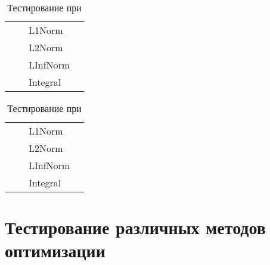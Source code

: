 \begin{table}
	\caption{Тестирование при }
	\centering
	\small
	\begin{tabularx}{1.0\textwidth}{| >{\raggedright\arraybackslash}X | >{\raggedright\arraybackslash}X | >{\raggedright\arraybackslash}X | >{\raggedright\arraybackslash}X |}
		\hline
		\centering{Входные точки}  & \centering{Функция} & \centering{Функционал} & \centering{Результат} \tabularnewline \hline    
		
		\multirow{4}{*}{\centering{(0.5; 0.5; 0.5)}} & \multirow{4}{*}{\centering{FFFFF}} & L1Norm & \centering{0.00000000E+000; 0.00000000E+000; 0.00000000E+000} \tabularnewline \cline{3-4}
		& & L2Norm & \centering{0.00000000E+000; 0.00000000E+000; 0.00000000E+000} \tabularnewline \cline{3-4}
		& & LInfNorm & \centering{0.00000000E+000; 0.00000000E+000; 0.00000000E+000} \tabularnewline \cline{3-4}
		& & Integral & \centering{0.00000000E+000; 0.00000000E+000; 0.00000000E+000} \tabularnewline \hline
	\end{tabularx}
	\label{tab:test4}
\end{table}

\begin{table}
	\caption{Тестирование при }
	\centering
	\small
	\begin{tabularx}{1.0\textwidth}{| >{\raggedright\arraybackslash}X | >{\raggedright\arraybackslash}X | >{\raggedright\arraybackslash}X | >{\raggedright\arraybackslash}X |}
		\hline
		\centering{Входные точки}  & \centering{Функция} & \centering{Функционал} & \centering{Результат} \tabularnewline \hline    
		
		\multirow{4}{*}{\centering{(0.5; 0.5; 0.5)}} & \multirow{4}{*}{\centering{FFFFF}} & L1Norm & \centering{0.00000000E+000; 0.00000000E+000; 0.00000000E+000} \tabularnewline \cline{3-4}
		& & L2Norm & \centering{0.00000000E+000; 0.00000000E+000; 0.00000000E+000} \tabularnewline \cline{3-4}
		& & LInfNorm & \centering{0.00000000E+000; 0.00000000E+000; 0.00000000E+000} \tabularnewline \cline{3-4}
		& & Integral & \centering{0.00000000E+000; 0.00000000E+000; 0.00000000E+000} \tabularnewline \hline
	\end{tabularx}
	\label{tab:test5}
\end{table}

\section{Тестирование различных методов оптимизации}